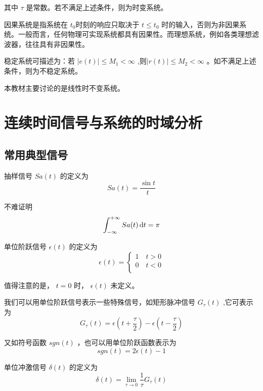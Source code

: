 \documentclass[UTF8,a4paper,11pt]{article}
\begin{document}
其中 $\tau$ 是常数。若不满足上述条件，则为时变系统。

因果系统是指系统在 $t_0$时刻的响应只取决于 $t\leq t_0$ 时的输入，否则为非因果系统。一般而言，任何物理可实现系统都具有因果性。而理想系统，例如各类理想滤波器，往往具有非因果性。

稳定系统可描述为：若 $\left | e(t) \right |\leq M_1<\infty$ ,则$\left | r(t) \right |\leq M_2<\infty$ 。如不满足上述条件，则为不稳定系统。

本教材主要讨论的是线性时不变系统。

\section{连续时间信号与系统的时域分析}
\subsection{常用典型信号}
抽样信号 $Sa(t)$ 的定义为
\begin{equation}
Sa(t)=\frac{\sin t}{t}
\end{equation}

不难证明
\begin{equation}
\int_{-\infty}^{+\infty} {Sa(t)} \,{\rm d}t=\pi
\end{equation}

单位阶跃信号 $\epsilon(t)$ 的定义为
\begin{equation}
\epsilon(t)=
\begin{cases}
1\quad t>0 \\
0\quad t<0 \\
\end{cases}
\label{pythagorean}
\end{equation}

值得注意的是， $t=0$ 时， $\epsilon(t)$ 未定义。

我们可以用单位阶跃信号表示一些特殊信号，如矩形脉冲信号 $G_{\tau}(t)$ ,它可表示为
\begin{equation}
G_{\tau}(t)=\epsilon(t+\frac{\tau}{2})-\epsilon(t-\frac{\tau}{2}) \label{pythagorean}
\end{equation}

又如符号函数 $sgn(t)$ ，也可以用单位阶跃函数表示为
\begin{equation}
sgn(t)=2\epsilon(t)-1
\end{equation}

单位冲激信号 $\delta(t)$ 的定义为
\begin{equation}
\delta(t)=\lim_{\tau \to 0}\frac{1}{\tau}G_{\tau}(t)
\end{equation}
\end{document}
